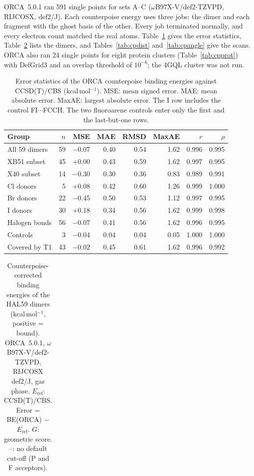\documentclass[journal=jcisd8,manuscript=suppinfo]{achemso}
\begin{document}
\begin{singlespace}
ORCA~5.0.1 ran 591 single points for sets A--C ($\omega$B97X-V/def2-TZVPD, RIJCOSX, def2/J). Each counterpoise energy uses three jobs: the dimer and each fragment with the ghost basis of the other. Every job terminated normally, and every electron count matched the real atoms. Table~\ref{tab:cpstat} gives the error statistics, Table~\ref{tab:cphal} lists the dimers, and Tables~\ref{tab:cpdist} and~\ref{tab:cpangle} give the scans. ORCA also ran 24 single points for eight protein clusters (Table~\ref{tab:cpprot}) with DefGrid3 and an overlap threshold of $10^{-6}$; the 4GQL cluster was not run.

\begin{table}[!htbp]\centering\footnotesize
\caption{Error statistics of the ORCA counterpoise binding energies against CCSD(T)/CBS (kcal\,mol$^{-1}$). MSE: mean signed error. MAE: mean absolute error. MaxAE: largest absolute error. The I row includes the control FI$\cdots$FCCH. The two fluoroarene controls enter only the first and the last-but-one rows.}\label{tab:cpstat}
\begin{tabular}{lrrrrrrr}\toprule Group & $n$ & MSE & MAE & RMSD & MaxAE & $r$ & $\rho$\\\midrule
All 59 dimers & 59 & $-$0.07 & 0.40 & 0.54 & 1.62 & 0.996 & 0.995\\
XB51 subset & 45 & +0.00 & 0.43 & 0.59 & 1.62 & 0.997 & 0.995\\
X40 subset & 14 & $-$0.30 & 0.30 & 0.36 & 0.83 & 0.989 & 0.991\\
Cl donors & 5 & +0.08 & 0.42 & 0.60 & 1.26 & 0.999 & 1.000\\
Br donors & 22 & $-$0.45 & 0.50 & 0.53 & 1.12 & 0.997 & 0.995\\
I donors & 30 & +0.18 & 0.34 & 0.56 & 1.62 & 0.999 & 0.998\\
Halogen bonds & 56 & $-$0.07 & 0.41 & 0.56 & 1.62 & 0.996 & 0.995\\
Controls & 3 & $-$0.04 & 0.04 & 0.04 & 0.05 & 1.000 & 1.000\\
Covered by T1 & 43 & $-$0.02 & 0.45 & 0.61 & 1.62 & 0.996 & 0.992\\
\bottomrule\end{tabular}\end{table}
{\scriptsize
\setlength{\tabcolsep}{3pt}
\begin{longtable}{lllrrrrrl}
\caption{Counterpoise-corrected binding energies of the HAL59 dimers (kcal\,mol$^{-1}$, positive = bound). ORCA~5.0.1, $\omega$B97X-V/def2-TZVPD, RIJCOSX def2/J, gas phase. $E_\mathrm{ref}$: CCSD(T)/CBS. Error = BE(ORCA) $-$ $E_\mathrm{ref}$. $G$: geometric score. --: no default cut-off (P and F acceptors).}\label{tab:cphal}\\

\end{longtable}}
\end{singlespace}
\end{document}
